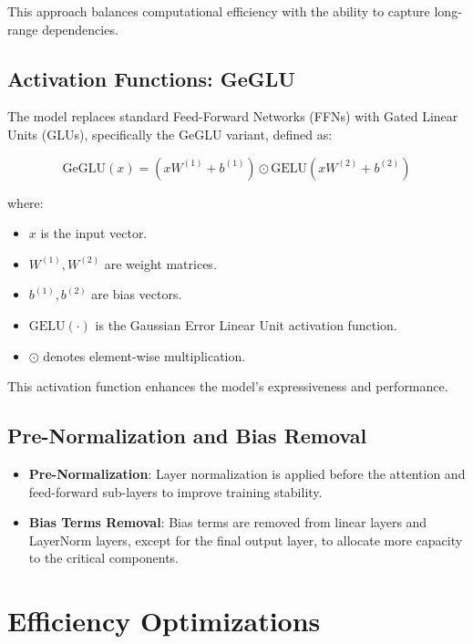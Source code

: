 \documentclass{article}
\begin{document}
This approach balances computational efficiency with the ability to capture long-range dependencies.  
  
\subsection{Activation Functions: GeGLU}  
  
The model replaces standard Feed-Forward Networks (FFNs) with Gated Linear Units (GLUs), specifically the GeGLU variant, defined as:  
  
\[  
\text{GeGLU}(x) = \left( x W^{(1)} + b^{(1)} \right) \odot \text{GELU}\left( x W^{(2)} + b^{(2)} \right)  
\]  
  
where:  
  
\begin{itemize}  
    \item \( x \) is the input vector.  
    \item \( W^{(1)}, W^{(2)} \) are weight matrices.  
    \item \( b^{(1)}, b^{(2)} \) are bias vectors.  
    \item \( \text{GELU}(\cdot) \) is the Gaussian Error Linear Unit activation function.  
    \item \( \odot \) denotes element-wise multiplication.  
\end{itemize}  
  
This activation function enhances the model's expressiveness and performance.  
  
\subsection{Pre-Normalization and Bias Removal}  
  
\begin{itemize}  
    \item \textbf{Pre-Normalization}: Layer normalization is applied before the attention and feed-forward sub-layers to improve training stability.  
    \item \textbf{Bias Terms Removal}: Bias terms are removed from linear layers and LayerNorm layers, except for the final output layer, to allocate more capacity to the critical components.  
\end{itemize}  
  
\section{Efficiency Optimizations}  
  
\end{document}
